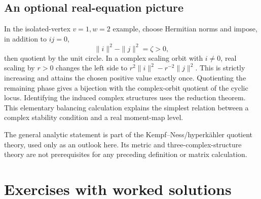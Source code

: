\documentclass[11pt,a4paper]{article}
\numberwithin{equation}{section}
\theoremstyle{definition}
\begin{document}
\subsection{An optional real-equation picture}
In the isolated-vertex $v=1,w=2$ example, choose Hermitian
norms and impose, in addition to $ij=0$,
\[
 \|i\|^2-\|j\|^2=\zeta>0,
\]
then quotient by the unit circle. In a complex scaling orbit
with $i\ne0$, real scaling by $r>0$ changes the left side to
$r^2\|i\|^2-r^{-2}\|j\|^2$. This is strictly increasing
and attains the chosen positive value exactly once. Quotienting
the remaining phase gives a bijection with the complex-orbit
quotient of the cyclic locus. Identifying the induced complex
structures uses the reduction theorem. This elementary
balancing calculation explains the simplest relation between
a complex stability condition and a real moment-map level.

The general analytic statement is part of the
Kempf--Ness/hyperkähler quotient theory, used only as an
outlook here. Its metric and three-complex-structure theory
are not prerequisites for any preceding definition or
matrix calculation.

\section{Exercises with worked solutions}
\label{sec:exercises}
\end{document}
